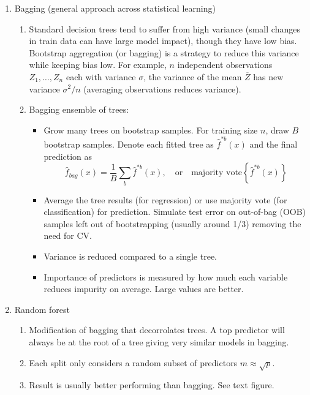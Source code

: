 \documentclass{article}
\begin{document}
\begin{enumerate}
\item Bagging (general approach across statistical learning)
\begin{enumerate}
\item Standard decision trees tend to suffer from high variance (small changes in train data can have large model impact), though they have low bias. Bootstrap aggregation (or bagging) is a strategy to reduce this variance while keeping bias low. For example, $n$ independent observations $Z_1, \dots, Z_n$ each with variance $\sigma$, the variance of the mean $\overline{Z}$ has new variance $\sigma^2/n$ (averaging observations reduces variance).
\item Bagging ensemble of trees:
\begin{itemize}
\item Grow many trees on bootstrap samples. For training size $n$, draw $B$ bootstrap samples. Denote each fitted tree as $\hat{f}^{*b}(x)$ and the final prediction as 
\[
\hat{f}_{bag}(x) = \frac{1}{B} \sum_b \hat{f}^{*b}(x),  \quad \text{or} \quad \text{majority vote} \left\{ \hat{f}^{*b}(x) \right\}
\]
\item Average the tree results (for regression) or use majority vote (for classification) for prediction. Simulate test error on out-of-bag (OOB) samples left out of bootstrapping (usually around 1/3) removing the need for CV.
\item Variance is reduced compared to a single tree.
\item Importance of predictors is measured by how much each variable reduces impurity on average. Large values are better.
\end{itemize}
\end{enumerate}

\item Random forest
\begin{enumerate}
\item Modification of bagging that decorrolates trees. A top predictor will always be at the root of a tree giving very similar models in bagging.
\item Each split only considers a random subset of predictors $m \approx \sqrt{p}$. 
\item Result is usually better performing than bagging. See text figure.
\end{enumerate}


\end{enumerate}
\end{document}
